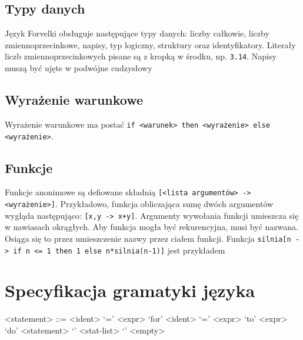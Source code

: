 \documentclass[4paper,10pt]{article}
\begin{document}
\subsection{Typy danych}
Język Forvelki obsługuje następujące typy danych: liczby całkowie, liczby zmiennoprzecinkowe, napisy, typ logiczny, struktury oraz identyfikatory.
Literały liczb zmiennoprzecinkowych pisane są z kropką w środku, np. \texttt{3.14}.
Napisy muszą być ujęte w podwójne cudzysłowy


\subsection{Wyrażenie warunkowe}
Wyrażenie warunkowe ma postać \texttt{if <warunek> then <wyrażenie> else <wyrażenie>}.

\subsection{Funkcje}
Funkcje anonimowe są defiowane składnią \texttt{[<lista argumentów> -> <wyrażenie>]}.
Przykładowo, funkcja obliczająca sumę dwóch argumentów wygląda następująco: \texttt{[x,y -> x+y]}.
Argumenty wywołania funkcji umieszcza się w nawiasach okrągłych.
Aby funkcja mogła być rekurencyjna, musi być nazwana.
Osiąga się to przez umieszczenie nazwy przez ciałem funkcji.
Funkcja \texttt{silnia[n -> if n <= 1 then 1 else n*silnia(n-1)]} jest przykładem 

\section{Specyfikacja gramatyki języka}

\begin{grammar}
 <statement> ::= <ident> `=' <expr>
	\alt `for' <ident> `=' <expr> `to' <expr> `do' <statement>
	\alt `{' <stat-list> `}'
	\alt <empty> 
\end{grammar}
\end{document}
